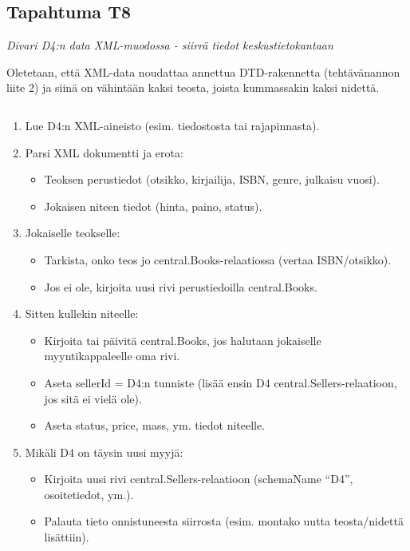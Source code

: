 \documentclass[11pt,a4paper]{article}
\begin{document}
\subsection{Tapahtuma T8}
{\large{\textit{Divari D4:n data XML-muodossa - siirrä tiedot keskustietokantaan}}}

Oletetaan, että XML-data noudattaa annettua DTD-rakennetta (tehtävänannon liite 2) ja siinä on vähintään kaksi teosta, joista kummassakin kaksi nidettä.

\inputminted{xml}{assets/dtd.xml}

\begin{enumerate}
	\item Lue D4:n XML-aineisto (esim. tiedostosta tai rajapinnasta).
	\item Parsi XML dokumentti ja erota:
	      \begin{itemize}
		      \item Teoksen perustiedot (otsikko, kirjailija, ISBN, genre, julkaisu vuosi).
		      \item Jokaisen niteen tiedot (hinta, paino, status).
	      \end{itemize}
	\item Jokaiselle teokselle:
	      \begin{itemize}
		      \item Tarkista, onko teos jo central.Books-relaatiossa (vertaa ISBN/otsikko).
		      \item Jos ei ole, kirjoita uusi rivi perustiedoilla central.Books.
	      \end{itemize}
	\item Sitten kullekin niteelle:
	      \begin{itemize}
		      \item Kirjoita tai päivitä central.Books, jos halutaan jokaiselle myyntikappaleelle oma rivi.
		      \item Aseta sellerId = D4:n tunniste (lisää ensin D4 central.Sellers-relaatioon, jos sitä ei vielä ole).
		      \item Aseta status, price, mass, ym. tiedot niteelle.
	      \end{itemize}
	\item Mikäli D4 on täysin uusi myyjä:
	      \begin{itemize}
		      \item Kirjoita uusi rivi central.Sellers-relaatioon (schemaName “D4”, osoitetiedot, ym.).
		      \item Palauta tieto onnistuneesta siirrosta (esim. montako uutta teosta/nidettä lisättiin).
	      \end{itemize}
\end{enumerate}
\end{document}
